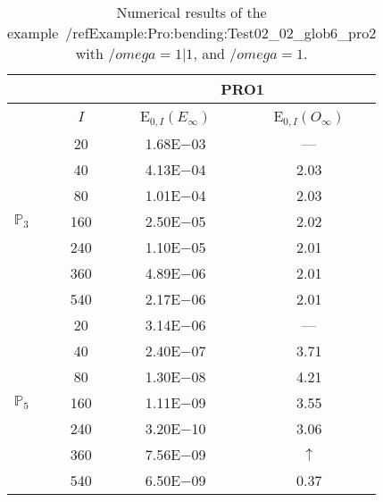 \begin{table}[H]
\caption{Numerical results of the example~/ref{Example:Pro:bending:Test02_02_glob6_pro2} with $/omega=1|1$, and $/omega=1$.}
\setlength{\tabcolsep}{5pt}
\centering
\begin{tabular}{@{}l c c c@{}}
\toprule
 &  & \multicolumn{2}{c}{PRO1}\\
\midrule
 & $I$ & E$_{0,I}(E_{\infty})$ & E$_{0,I}(O_{\infty})$\\
\midrule
\multirow{7}{*}{$\mathbb{P}_{3}$}
 & 20 & 1.68E$-$03 & ---\\
 & 40 & 4.13E$-$04 & 2.03\\
 & 80 & 1.01E$-$04 & 2.03\\
 & 160 & 2.50E$-$05 & 2.02\\
 & 240 & 1.10E$-$05 & 2.01\\
 & 360 & 4.89E$-$06 & 2.01\\
 & 540 & 2.17E$-$06 & 2.01\\
\midrule
\multirow{7}{*}{$\mathbb{P}_{5}$}
 & 20 & 3.14E$-$06 & ---\\
 & 40 & 2.40E$-$07 & 3.71\\
 & 80 & 1.30E$-$08 & 4.21\\
 & 160 & 1.11E$-$09 & 3.55\\
 & 240 & 3.20E$-$10 & 3.06\\
 & 360 & 7.56E$-$09 & $\uparrow$\\
 & 540 & 6.50E$-$09 & 0.37\\
\bottomrule
\end{tabular}
\label{Table:PRO:test_02_02_test21_pro2}
\end{table}
